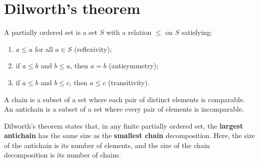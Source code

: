 \section*{Dilworth’s theorem}

A partially ordered set is a set $S$ with a relation $\le$ on $S$ satisfying:
\begin{enumerate}
\item $a \le a$ for all $a \in S$ (reflexivity);
\item if $a \le b$ and $b \le a$, then $a = b$ (antisymmetry);
\item if $a \le b$ and $b \le c$, then $a \le c$ (transitivity).
\end{enumerate}

A chain is a subset of a set where each pair of distinct elements is comparable.
An antichain is a subset of a set where every pair of elements is incomparable.

Dilworth's theorem states that, in any finite partially ordered set, 
the \textbf{largest antichain} has the same size as the \textbf{smallest chain} decomposition. 
Here, the size of the antichain is its number of elements, and the size of the chain decomposition is its number of chains.

